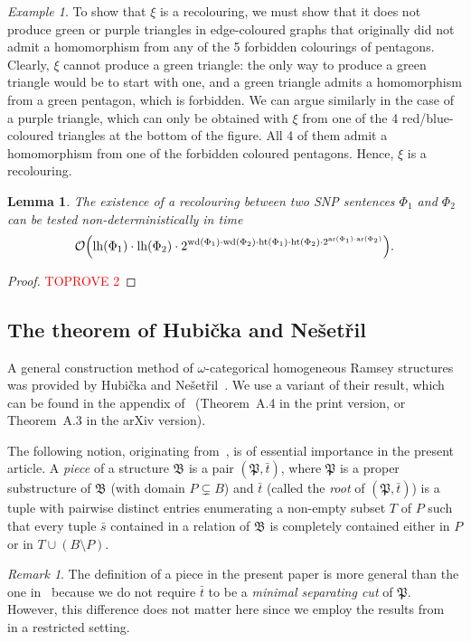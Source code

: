 \documentclass[oneside,reqno,12pt]{amsart}
\theoremstyle{plain}
\newtheorem{lemma}[thm]{Lemma}
\theoremstyle{remark}
\newtheorem{remark}[thm]{Remark}
\newtheorem{example}[thm]{Example}
\newcommand{\struct}[1]{\mathfrak{#1}}
\newcommand{\hh}{\ensuremath{\mathrm{ht}}\xspace}
\newcommand{\lh}{\ensuremath{\mathrm{lh}}\xspace}
\newcommand{\wh}{\ensuremath{\mathrm{wd}}\xspace}
\newcommand{\ar}{\ensuremath{\mathrm{ar}}\xspace}
\begin{document}
{\begin{example}
To show that $\xi$ is a recolouring, we must show that it does not produce green or purple triangles in edge-coloured graphs that originally did not admit a homomorphism from any of the 5 forbidden colourings of pentagons.
Clearly, $\xi$ cannot produce a green triangle:  the only way to produce a green triangle would be  to start with one, and a green triangle admits a homomorphism from a green pentagon, which is forbidden.
We can argue similarly in the case of a purple triangle, which can only be obtained with $\xi$ from one of the 4 red/blue-coloured triangles at the bottom of the figure.
All 4 of them admit a homomorphism from one of the forbidden coloured pentagons. Hence, $\xi$ is a recolouring. 
\end{example}
\begin{lemma}\label{lemma:recolouring_nexptime} 
The existence of a recolouring between two SNP sentences $\Phi_1$ and $\Phi_2$ can be tested non-deterministically in time $$\mathcal{O}\Bigl(\lh(\Phi_1)\cdot \lh(\Phi_2) \cdot 2^{\wh(\Phi_1)\cdot \wh(\Phi_2)\cdot \hh(\Phi_1)\cdot\hh(\Phi_2) \cdot  2^{\ar(\Phi_1)\cdot \ar(\Phi_2)}}\Bigr).$$   
\end{lemma}

\begin{proof}\textcolor{red}{TOPROVE 2}\end{proof}

\subsection{The theorem of Hubi\v{c}ka and Ne\v{s}et\v{r}il}

A general construction method  of $\omega$-categorical homogeneous Ramsey structures was  provided by Hubi\v{c}ka and Ne\v{s}et\v{r}il~\cite{hubickanesetril2019}.
We use a variant of their result, which can be found in the appendix of~\cite{bodirsky2018_article} (Theorem~A.4 in the print version, or Theorem~A.3 in the arXiv version).


The following notion, originating from~\cite{hubicka2015}, is of essential importance in the present article.
A \emph{piece} of a structure $\struct{B}$ is a pair $(\struct{P},\bar{t})$, where $\struct{P}$ is a proper substructure of $\struct{B}$ (with domain $P \subsetneq B$) and $\bar t$ (called the \emph{root} of $(\struct{P},\bar{t})$) is a tuple with pairwise distinct entries enumerating a non-empty subset $T$ of $P$  such that every tuple $\bar s$ contained in a relation of $\struct B$ is completely contained either in $P$ or in $T\cup (B\setminus P)$.  
\begin{remark} The definition of a piece in the present paper is more general than the one in~\cite{hubicka2015} because we do not require $\bar t$ to be a \emph{minimal separating cut} of $\struct{P}$. However, this difference does not matter here since we employ the results from~\cite{hubicka2015} in a restricted setting.
\end{remark}

}
\end{document}
